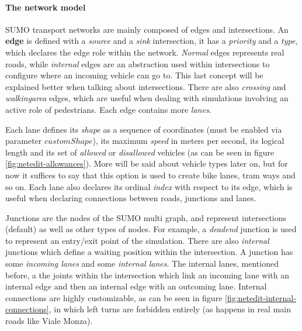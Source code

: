 \paragraph{The network model}

SUMO transport networks are mainly composed of edges and intersections. An \textbf{edge} is defined with a \textit{source} and a \textit{sink} intersection, it has a \textit{priority} and a \textit{type}, which declares the edge role within the network. \textit{Normal} edges represents real roads, while \textit{internal} edges are an abstraction used within intersections to configure where an incoming vehicle can go to. This last concept will be explained better when talking about intersections. There are also \textit{crossing} and \textit{walkingarea} edges, which are useful when dealing with simulations involving an active role of pedestrians. Each edge contains more \textit{lanes}.

Each lane defines its \textit{shape} as a sequence of coordinates (must be enabled via parameter $customShape$), its maximum \textit{speed} in meters per second, its logical length and its set of \textit{allowed} or \textit{disallowed} vehicles (as can be seen in figure \ref{fig:netedit-allowances}). More will be said about vehicle types later on, but for now it suffices to say that this option is used to create bike lanes, tram ways and so on. Each lane also declares its ordinal \textit{index} with respect to its edge, which is useful when declaring connections between roads, junctions and lanes.


Junctions are the nodes of the SUMO multi graph, and represent intersections (default) as well as other types of nodes. For example, a \textit{deadend} junction is used to represent an entry/exit point of the simulation. There are also \textit{internal} junctions which define a waiting position within the intersection. A junction has some \textit{incoming lanes} and some \textit{internal lanes}. The internal lanes, mentioned before, a the joints within the intersection which link an incoming lane with an internal edge and then an internal edge with an outcoming lane. Internal connections are highly customizable, as can be seen in figure \ref{fig:netedit-internal-connections}, in which left turns are forbidden entirely (as happens in real main roads like Viale Monza).

